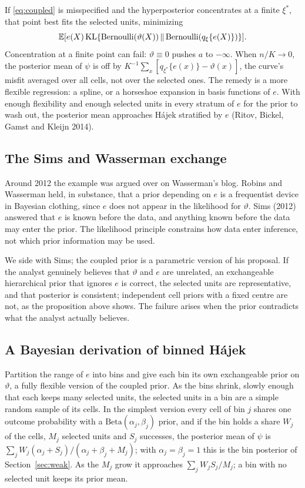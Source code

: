 If \eqref{eq:coupled} is misspecified and the hyperposterior concentrates at a finite $\xi^\ast$, that point best fits the selected units, minimizing
\[
\mathbb{E}[e(X)\,\mathrm{KL}\{\mathrm{Bernoulli}(\vartheta(X)) \,\|\, \mathrm{Bernoulli}(q_\xi\{e(X)\})\}].
\]
Concentration at a finite point can fail: $\vartheta \equiv 0$ pushes $a$ to $-\infty$. When $n/K \to 0$, the posterior mean of $\psi$ is off by $K^{-1}\sum_x [q_{\xi^\ast}\{e(x)\} - \vartheta(x)]$, the curve's misfit averaged over all cells, not over the selected ones. The remedy is a more flexible regression: a spline, or a horseshoe expansion in basis functions of $e$. With enough flexibility and enough selected units in every stratum of $e$ for the prior to wash out, the posterior mean approaches H\'ajek stratified by $e$ (Ritov, Bickel, Gamst and Kleijn 2014).

\subsection{The Sims and Wasserman exchange}

Around 2012 the example was argued over on Wasserman's blog. Robins and Wasserman held, in substance, that a prior depending on $e$ is a frequentist device in Bayesian clothing, since $e$ does not appear in the likelihood for $\vartheta$. Sims (2012) answered that $e$ is known before the data, and anything known before the data may enter the prior. The likelihood principle constrains how data enter inference, not which prior information may be used.

We side with Sims; the coupled prior is a parametric version of his proposal. If the analyst genuinely believes that $\vartheta$ and $e$ are unrelated, an exchangeable hierarchical prior that ignores $e$ is correct, the selected units are representative, and that posterior is consistent; independent cell priors with a fixed centre are not, as the proposition above shows. The failure arises when the prior contradicts what the analyst actually believes.

\subsection{A Bayesian derivation of binned H\'ajek}

Partition the range of $e$ into bins and give each bin its own exchangeable prior on $\vartheta$, a fully flexible version of the coupled prior. As the bins shrink, slowly enough that each keeps many selected units, the selected units in a bin are a simple random sample of its cells. In the simplest version every cell of bin $j$ shares one outcome probability with a $\mathrm{Beta}(\alpha_j, \beta_j)$ prior, and if the bin holds a share $W_j$ of the cells, $M_j$ selected units and $S_j$ successes, the posterior mean of $\psi$ is $\sum_j W_j(\alpha_j + S_j)/(\alpha_j + \beta_j + M_j)$; with $\alpha_j = \beta_j = 1$ this is the bin posterior of Section~\ref{sec:weak}. As the $M_j$ grow it approaches $\sum_j W_jS_j/M_j$; a bin with no selected unit keeps its prior mean.

